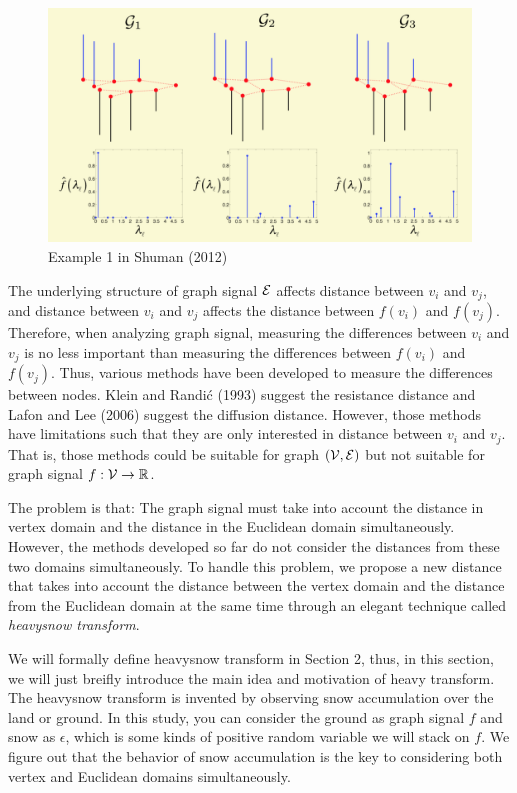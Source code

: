 \documentclass[preprint, review, 12pt]{article}
\theoremstyle{definition}
\theoremstyle{remark}
\begin{document}
\begin{figure}[htbp]
\centering
\includegraphics[width=1\textwidth]{Fig/Fig1.png} %
\caption{Example 1 in Shuman (2012)}
\end{figure}

The underlying structure of graph signal ${\cal E}$ affects distance between $v_i$ and $v_j$, and distance  between $v_i$ and $v_j$ affects the distance between $f(v_i)$ and $f(v_j)$. Therefore, when analyzing graph signal, measuring the differences between $v_i$ and $v_j$ is no less important than measuring the differences between $f(v_i)$ and $f(v_j)$. Thus, various methods have been developed to measure the differences between nodes. Klein and Randić (1993) suggest the resistance distance and Lafon and Lee (2006) suggest the diffusion distance. However, those methods have limitations such that they are only interested in distance between $v_i$ and $v_j$. That is, those methods could be suitable for graph $({\cal V},{\cal E})$ but not suitable for graph signal $f:{\cal V} \to \mathbb{R}$. 

The problem is that: The graph signal must take into account the distance in vertex domain and the distance in the Euclidean domain simultaneously. However, the methods developed so far do not consider the distances from these two domains simultaneously.
To handle this problem, we propose a new distance that takes into account the distance between the vertex domain and the distance from the Euclidean domain at the same time through an elegant technique called \emph{heavysnow transform}. 

We will formally define heavysnow transform in Section 2, thus, in this section, we will just breifly introduce the main idea and motivation of heavy transform. The heavysnow transform is invented by observing snow accumulation over the land or ground. In this study, you can consider the ground as graph signal $f$ and snow as $\epsilon$, which is some kinds of positive random variable we will stack on $f$. We figure out that the behavior of snow accumulation is the key to considering both vertex and Euclidean domains simultaneously. 
\end{document}
